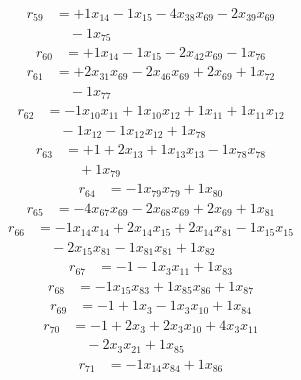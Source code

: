 \[\begin{aligned}
r_{59} &= + 1 x_{14} - 1 x_{15} - 4 x_{38} x_{69} - 2 x_{39} x_{69} \\
 &\quad - 1 x_{75}
\end{aligned}\]
\[\begin{aligned}
r_{60} &= + 1 x_{14} - 1 x_{15} - 2 x_{42} x_{69} - 1 x_{76}
\end{aligned}\]
\[\begin{aligned}
r_{61} &= + 2 x_{31} x_{69} - 2 x_{46} x_{69} + 2 x_{69} + 1 x_{72} \\
 &\quad - 1 x_{77}
\end{aligned}\]
\[\begin{aligned}
r_{62} &= - 1 x_{10} x_{11} + 1 x_{10} x_{12} + 1 x_{11} + 1 x_{11} x_{12} \\
 &\quad - 1 x_{12} - 1 x_{12} x_{12} + 1 x_{78}
\end{aligned}\]
\[\begin{aligned}
r_{63} &= + 1 + 2 x_{13} + 1 x_{13} x_{13} - 1 x_{78} x_{78} \\
 &\quad + 1 x_{79}
\end{aligned}\]
\[\begin{aligned}
r_{64} &= - 1 x_{79} x_{79} + 1 x_{80}
\end{aligned}\]
\[\begin{aligned}
r_{65} &= - 4 x_{67} x_{69} - 2 x_{68} x_{69} + 2 x_{69} + 1 x_{81}
\end{aligned}\]
\[\begin{aligned}
r_{66} &= - 1 x_{14} x_{14} + 2 x_{14} x_{15} + 2 x_{14} x_{81} - 1 x_{15} x_{15} \\
 &\quad - 2 x_{15} x_{81} - 1 x_{81} x_{81} + 1 x_{82}
\end{aligned}\]
\[\begin{aligned}
r_{67} &= - 1 - 1 x_{3} x_{11} + 1 x_{83}
\end{aligned}\]
\[\begin{aligned}
r_{68} &= - 1 x_{15} x_{83} + 1 x_{85} x_{86} + 1 x_{87}
\end{aligned}\]
\[\begin{aligned}
r_{69} &= - 1 + 1 x_{3} - 1 x_{3} x_{10} + 1 x_{84}
\end{aligned}\]
\[\begin{aligned}
r_{70} &= - 1 + 2 x_{3} + 2 x_{3} x_{10} + 4 x_{3} x_{11} \\
 &\quad - 2 x_{3} x_{21} + 1 x_{85}
\end{aligned}\]
\[\begin{aligned}
r_{71} &= - 1 x_{14} x_{84} + 1 x_{86}
\end{aligned}\]
